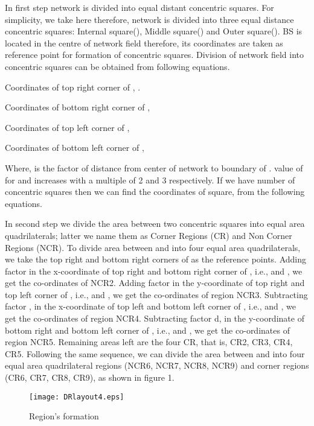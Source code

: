 \documentclass[3p,times,procedia]{elsarticle}
\begin{document}
In first step network is divided into  equal distant concentric squares. For simplicity, we take  here therefore, network is divided into three equal distance concentric squares: Internal square(), Middle square() and Outer square(). BS is located in the centre of network field therefore, its coordinates are taken as reference point for formation of concentric squares. Division of network field into concentric squares can be obtained from following equations.

Coordinates of top right corner of , .


Coordinates of bottom right corner of , 


Coordinates of top left corner of , 


Coordinates of bottom left corner of , 


Where,  is the factor of distance from center of network to boundary of . value of  for  and  increases with a multiple of 2 and 3 respectively. If we have  number of concentric squares then we can find the coordinates of  square,  from the following equations. 









In second step we divide the area between two concentric squares into equal area quadrilaterals; latter we name them as Corner  Regions (CR) and Non Corner  Regions (NCR). To divide area between  and  into four equal area quadrilaterals, we take the top right and bottom right corners of  as the reference points. Adding factor  in the x-coordinate of top right and bottom right corner of , i.e.,  and , we get the co-ordinates of NCR2. Adding factor  in the y-coordinate of top right and top left corner of , i.e.,  and , we get the co-ordinates of region NCR3. Subtracting factor , in the x-coordinate of top left and bottom left corner of , i.e.,  and , we get the co-ordinates of region NCR4. Subtracting factor d, in the y-coordinate of bottom right and bottom left corner of , i.e.,  and , we get the co-ordinates of region NCR5. Remaining areas left are the four CR, that is, CR2, CR3, CR4, CR5.
Following the same sequence,  we can divide the area between  and  into four equal area quadrilateral regions (NCR6, NCR7, NCR8, NCR9)  and corner regions (CR6, CR7, CR8, CR9), as shown in figure 1.

\begin{figure*}[ht!]       \centering
\texttt{[image: DRlayout4.eps]}
\caption{Region's formation}
\label{DRlayout4}
\end{figure*}
\end{document}
